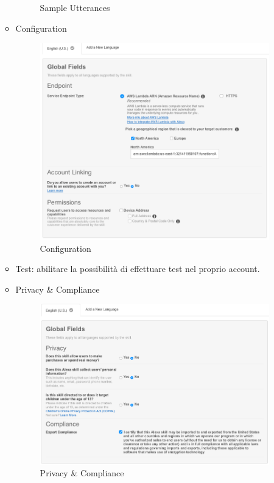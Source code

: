 \documentclass[../ManualeSviluppatore_v1.0.0.tex]{subfiles}
\begin{document}
\begin{enumerate}
\begin{itemize}
\begin{figure}[!h]
						\caption{Sample Utterances}
					\end{figure}
				\newpage
				\item Configuration
					\begin{figure}[!h]
						\centering
						\includegraphics[width=\textwidth]{Screenshot/ASK/Configuration.png}
						\caption{Configuration}
					\end{figure}
				\item Test: abilitare la possibilità di effettuare test nel proprio account.
				\newpage
				\item Privacy \& Compliance
					\begin{figure}[!h]
						\centering
						\includegraphics[width=\textwidth]{Screenshot/ASK/PrivacyCompliance.png}
						\caption{Privacy \& Compliance}
					\end{figure}
				\end{itemize}
		\end{enumerate}
\end{document}
